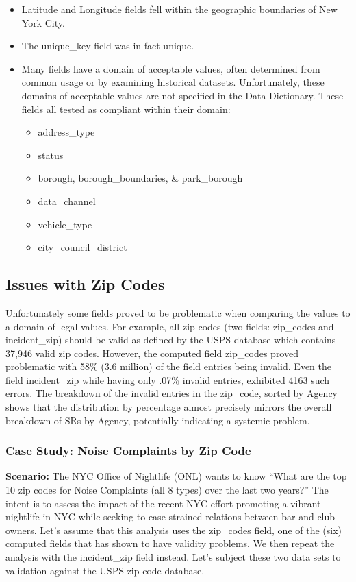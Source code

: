 \documentclass[12pt, titlepage]{article}
\begin{document}
\begin{itemize}
	\item Latitude and Longitude fields fell within the geographic 
	boundaries of New York City. 
	\item The unique\_key field was in fact unique.
	\item Many fields have a domain of acceptable values, often 
	determined from common usage or by examining historical 
	datasets. Unfortunately, these domains of acceptable 
	values are not specified in the Data Dictionary. These fields all tested as 
	compliant within their domain:
	\begin{itemize}
		\item address\_type
		\item status
		\item borough, borough\_boundaries, \& park\_borough 
		\item data\_channel
		\item vehicle\_type
		\item city\_council\_district
	\end{itemize}	
\end{itemize}

\subsection{Issues with Zip Codes}
\label{sec:zipcodesissues}
	 Unfortunately some fields proved to be  problematic when comparing 
	 the values to a domain of legal values. For example, all zip codes 
	 (two fields: zip\_codes and incident\_zip) should be valid as defined 
	 by the USPS database which contains 37,946 valid zip codes. However,
	 the computed field zip\_codes proved problematic with 
	58\% (3.6 million) of the field entries being invalid. Even the 
	field incident\_zip while having only .07\% invalid entries, exhibited
	4163 such errors. The breakdown of the invalid entries in the zip\_code, sorted by 
	Agency shows that the distribution by percentage almost precisely 
	mirrors the overall breakdown of SRs by Agency, potentially indicating
	a systemic problem.
	
\subsubsection{Case Study: Noise Complaints by Zip Code}
\label{sec:case-study-zip-codes}
		\textbf{Scenario:} The NYC Office of Nightlife (ONL) wants to 
		know ``What are the top 10 zip codes for Noise Complaints (all 8 types) 
		over the last two years?'' The intent is to assess the impact of the 
		recent NYC effort promoting a vibrant nightlife 
		in NYC while seeking to ease strained relations 
		between bar and club owners. Let's assume that this analysis 
		uses the zip\_codes field, one of the (six) 
		computed fields that has shown to have validity problems. 
		We then repeat the analysis with the incident\_zip field instead. Let's 
		subject these two data sets to validation against the USPS zip code database.
	 
\end{document}
